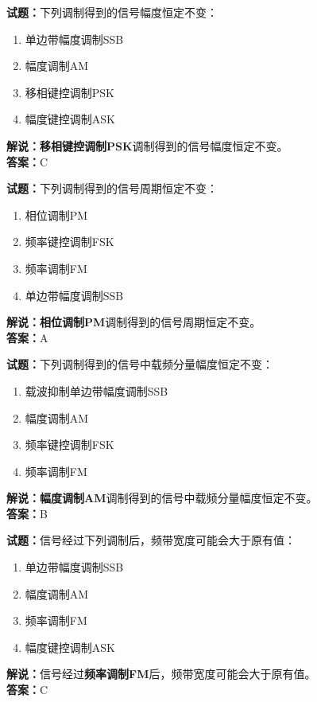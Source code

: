 \documentclass{ctexbook}
\begin{document}
\vspace{1em}

\textbf{试题：}下列调制得到的信号幅度恒定不变：
\begin{enumerate}[leftmargin=3em]
  \item 单边带幅度调制SSB
  \item 幅度调制AM
  \item 移相键控调制PSK
  \item 幅度键控调制ASK
\end{enumerate}
\noindent\textbf{解说：}\textbf{移相键控调制PSK}调制得到的信号幅度恒定不变。\\\noindent\textbf{答案：}C

\vspace{1em}

\textbf{试题：}下列调制得到的信号周期恒定不变：
\begin{enumerate}[leftmargin=3em]
  \item 相位调制PM
  \item 频率键控调制FSK
  \item 频率调制FM
  \item 单边带幅度调制SSB
\end{enumerate}
\noindent\textbf{解说：}\textbf{相位调制PM}调制得到的信号周期恒定不变。\\\noindent\textbf{答案：}A

\vspace{1em}

\textbf{试题：}下列调制得到的信号中载频分量幅度恒定不变：
\begin{enumerate}[leftmargin=3em]
  \item 载波抑制单边带幅度调制SSB
  \item 幅度调制AM
  \item 频率键控调制FSK
  \item 频率调制FM
\end{enumerate}
\noindent\textbf{解说：}\textbf{幅度调制AM}调制得到的信号中载频分量幅度恒定不变。\\\noindent\textbf{答案：}B

\vspace{1em}

\textbf{试题：}信号经过下列调制后，频带宽度可能会大于原有值：
\begin{enumerate}[leftmargin=3em]
  \item 单边带幅度调制SSB
  \item 幅度调制AM
  \item 频率调制FM
  \item 幅度键控调制ASK
\end{enumerate}
\noindent\textbf{解说：}信号经过\textbf{频率调制FM}后，频带宽度可能会大于原有值。\\\noindent\textbf{答案：}C
\end{document}
